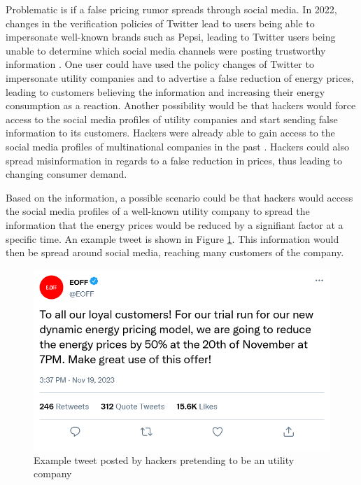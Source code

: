 Problematic is if a false pricing rumor spreads through social media.
In 2022, changes in the verification policies of Twitter lead to users being able 
to impersonate well-known brands such as Pepsi, leading to Twitter 
users being unable to determine which social media channels were
posting trustworthy information \cite{twitterchaos}. One user could
have used the policy changes of Twitter to impersonate 	utility companies
and to advertise a false reduction of energy prices, leading to customers
believing the information and increasing their energy consumption as a 
reaction. Another possibility would be that hackers would force access to the
social media profiles of utility companies and start sending false 
information to its customers. Hackers were already able to gain access
to the social media profiles of multinational companies in the past
\cite{twitterhacker}. Hackers could also spread misinformation in regards
to a false reduction in prices, thus leading to changing consumer demand.

Based on the information, a possible scenario could be that hackers would
access the social media profiles of a well-known utility company
to spread the information that the energy prices would be reduced by 
a signifiant factor at a specific time. An example tweet is shown in 
Figure \ref{demandtweet}. This information would then be 
spread around social media, reaching many customers of the company.

\begin{figure}[!ht]
    \center
    \includegraphics[scale=.4]{figs/eondemandresponse.png}
    \caption{Example tweet posted by hackers pretending to be an utility company}
    \label{demandtweet}
\end{figure}

